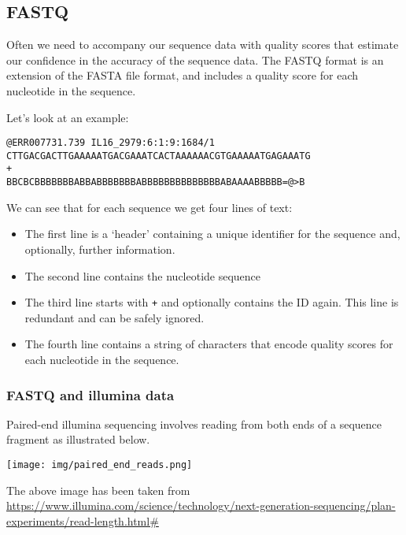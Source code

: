 \documentclass[11pt]{article}
\providecommand{\tightlist}{%
      \setlength{\itemsep}{0pt}\setlength{\parskip}{0pt}}
\begin{document}
\hypertarget{fastq}{%
\subsection{FASTQ}\label{fastq}}

Often we need to accompany our sequence data with quality scores that
estimate our confidence in the accuracy of the sequence data. The FASTQ
format is an extension of the FASTA file format, and includes a quality
score for each nucleotide in the sequence.

Let's look at an example:

\begin{verbatim}
@ERR007731.739 IL16_2979:6:1:9:1684/1
CTTGACGACTTGAAAAATGACGAAATCACTAAAAAACGTGAAAAATGAGAAATG
+
BBCBCBBBBBBBABBABBBBBBBABBBBBBBBBBBBBBABAAAABBBBB=@>B
\end{verbatim}

We can see that for each sequence we get four lines of text:

\begin{itemize}
\tightlist
\item
  The first line is a `header' containing a unique identifier for the
  sequence and, optionally, further information.
\item
  The second line contains the nucleotide sequence
\item
  The third line starts with \texttt{+} and optionally contains the ID
  again. This line is redundant and can be safely ignored.
\item
  The fourth line contains a string of characters that encode quality
  scores for each nucleotide in the sequence.
\end{itemize}

    \hypertarget{fastq-and-illumina-data}{%
\subsubsection{FASTQ and illumina data}\label{fastq-and-illumina-data}}

Paired-end illumina sequencing involves reading from both ends of a
sequence fragment as illustrated below.


\begin{center}
\texttt{[image: img/paired\_end\_reads.png]}
\end{center}


The above image has been taken from
\url{https://www.illumina.com/science/technology/next-generation-sequencing/plan-experiments/read-length.html\#}
\end{document}

